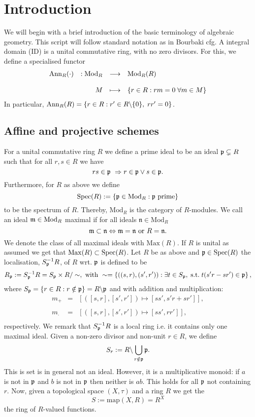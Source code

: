 \section{Introduction}
We will begin with a brief introduction of the basic terminology of algebraic geometry. This script will follow standard notation as in Bourbaki cfg. \cite{bou} A integral domain (ID) is a unital commutative ring, with no zero divisors. For this, we define a specialised functor
$$\bao{rrcl}
\mrm{Ann}_R(\cdot) &:\modr& \longrightarrow& \modr(R)\\
&&&\\
&M &\longmapsto&\{r \in R : r m = 0\; \forall m \in M\}\\
\ea$$
In particular, $\mrm{Ann}_R(R)  = \{r \in R : r' \in R \backslash\{0\},\; r r' = 0\}$.
\subsection{Affine and projective schemes}
For a unital commutative ring $R$ we define a prime ideal to be an ideal $\prm \subsetneq R$ such that for all $r, s \in R$ we have
$$r s \in \prm \ \Rightarrow r \in \prm \vee s \in \prm.$$
Furthermore, for $R$ as above we define
$$\specr := \{\prm \in \mathrm{Mod}_R : \prm \ \mathrm{prime}\}$$
to be the spectrum of $R$. Thereby, $\mathrm{Mod}_R$ is the category of $R$-modules. We call an ideal $\mx \in \mathrm{Mod}_R$ maximal if for all ideals $\mathfrak{n} \in \mathrm{Mod}_R$
$$\mx \subset \mathfrak{n} \Leftrightarrow \mx = \mathfrak{n} \ \mathrm{or}\ R = \mathfrak{n}.$$
We denote the class of all maximal ideals with $\mathrm{Max}(R)$. If $R$ is unital as assumed we get that $\mathrm{Max}(R) \subset \specr$. Let $R$ be as above and $\prm \in \specr$ the localisation, $S_\prm^{-1} R$, of $R$ wrt. $\prm$ is defined to be
$$R_\prm := S_{\prm}^{-1}R = S_\prm \times R/\sim, \ \mathrm{with}\ \sim =\left\{\left((s,r),(s',r')\right) : \exists t \in S_\prm, \;\mrm{s.t.}\; t(s' r - s r') \in \prm\right\},$$
where $S_\prm = \{r \in R : r \notin \prm\} = R \backslash \prm$ and with addition and multiplication:
$$\begin{array}{rcl}
m_+ &=& \left[\left([s,r],[s',r']\right) \longmapsto [s s', s' r + s r']\right],\\
&&\\
m_\cdot &=& \left[\left([s,r],[s',r']\right) \longmapsto [s s', r r']\right],\\
\end{array}$$
respectively. We remark that $S_\prm^{-1}R$ is a local ring i.e. it contains only one maximal ideal. Given a non-zero divisor and non-unit $r \in R$, we define
$$S_r := R \backslash \bigcup_{r \notin \prm} \prm.$$
This is set is in general not an ideal. However, it is a multiplicative monoid: if $a$ is not in $\prm$ and $b$ is not in $\prm$ then neither is $a b$. This holds for all $\prm$ not containing $r$. Now, given a topological space $(X, \tau)$ and a ring $R$ we get the 
$$S := \mathrm{map}(X,R) = R^X$$
the ring of $R$-valued functions.
